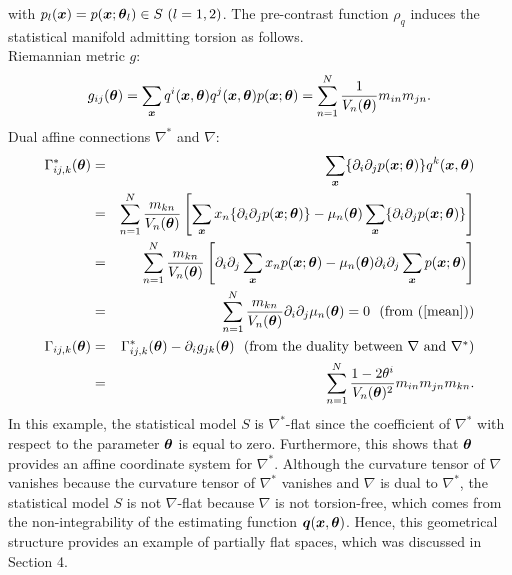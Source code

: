 \documentclass[graybox]{svmult}
\newcommand{\bm}[1]{\mbox{\boldmath $#1$}}
\newcommand{\bms}[1]{\mbox{\scriptsize\boldmath $#1$}}
\begin{document}
%
with $p_l(\bm{x})=p(\bm{x};\bm{\theta}_l) \in S \ (l=1,2)$.
The pre-contrast function $\rho_q$ induces the statistical manifold admitting torsion as follows. \\
%
Riemannian metric $g$:
%
\begin{eqnarray*}
   g_{ij}(\bm{\theta}) = \sum_{\bms{x}}q^i(\bm{x},\bm{\theta})q^j(\bm{x},\bm{\theta})p(\bm{x};\bm{\theta})
                       = \sum_{n=1}^{N}\frac{1}{V_n(\bm{\theta})}m_{in}m_{jn}.
\end{eqnarray*}
%
Dual affine connections $\nabla^{\ast}$ and $\nabla$:
%
\begin{eqnarray*}
   \Gamma_{ij,k}^{\ast}(\bm{\theta}) &=& \sum_{\bms{x}}\{\partial_i\partial_jp(\bm{x};\bm{\theta})\}
                                         q^k(\bm{x},\bm{\theta}) \\
                                     &=& \sum_{n=1}^{N}\frac{m_{kn}}{V_n(\bm{\theta})}
                                         \left[\sum_{\bms{x}}x_n\{\partial_i\partial_jp(\bm{x};\bm{\theta})\}
                                         - \mu_n(\bm{\theta})\sum_{\bms{x}}\{\partial_i\partial_jp(\bm{x};\bm{\theta})\}
                                         \right] \\
                                     &=& \sum_{n=1}^{N}\frac{m_{kn}}{V_n(\bm{\theta})}
                                         \left[\partial_i\partial_j\sum_{\bms{x}}x_np(\bm{x};\bm{\theta})
                                         - \mu_n(\bm{\theta})\partial_i\partial_j\sum_{\bms{x}}p(\bm{x};\bm{\theta})
                                         \right] \\
                                     &=& \sum_{n=1}^{N}\frac{m_{kn}}{V_n(\bm{\theta})}\partial_i\partial_j\mu_n(\bm{\theta})
                                      = 0 \vspace{2mm} \ \ (\mbox{from (\ref{mean})}) \\
   \Gamma_{ij,k}(\bm{\theta}) &=& \Gamma_{ij,k}^{\ast}(\bm{\theta}) - \partial_ig_{jk}(\bm{\theta}) \ \ 
                                  (\mbox{from the duality between $\nabla$ and $\nabla^{\ast}$}) \\
                              &=& \sum_{n=1}^{N}\frac{1-2\theta^i}{V_n(\bm{\theta})^2}m_{in}m_{jn}m_{kn}.
\end{eqnarray*}
%
In this example, the statistical model $S$ is $\nabla^{\ast}$-flat since the coefficient of $\nabla^{\ast}$ 
with respect to the parameter $\bm{\theta}$ is equal to zero.
Furthermore, this shows that $\bm{\theta}$ provides an affine coordinate system for $\nabla^{\ast}$.
Although the curvature tensor of $\nabla$ vanishes because the curvature tensor of $\nabla^{\ast}$
vanishes and $\nabla$ is dual to $\nabla^{\ast}$, the statistical model $S$ is not $\nabla$-flat 
because $\nabla$ is not torsion-free, which comes from the non-integrability of the estimating 
function $\bm{q}(\bm{x},\bm{\theta})$.
Hence, this geometrical structure provides an example of partially flat spaces, which was discussed
in Section 4.
\end{document}
